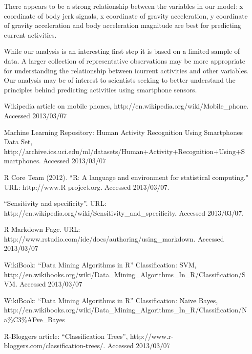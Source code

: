 \documentclass[a4paper,12pt]{extarticle}
\begin{document}
There appears to be a strong relationship between the variables in our model: x coordinate of body jerk signals, x coordinate of gravity acceleration, y coordinate of gravity acceleration and body acceleration magnitude are best for predicting current activities.

While our analysis is an interesting first step it is based on a limited sample of data. A larger collection of representative observations may be more appropriate for understanding the relationship between icurrent activities and other variables. Our analysis may be of interest to scientists seeking to better understand the principles behind predicting activities using smartphone sensors.

\newpage


\begin{thebibliography}{9}

  Wikipedia article on mobile phones, http://en.wikipedia.org/wiki/Mobile\_phone. Accessed 2013/03/07

  Machine Learning Repository: Human Activity Recognition Using Smartphones Data Set, http://archive.ics.uci.edu/ml/datasets/Human+Activity+Recognition+Using+Smartphones. Accessed 2013/03/07

  R Core Team (2012). ``R: A language and environment for statistical computing." URL: http://www.R-project.org. Accessed 2013/03/07.

  ``Sensitivity and specificity''. URL: http://en.wikipedia.org/wiki/Sensitivity\_and\_specificity. Accessed 2013/03/07.

  R Markdown Page. URL: http://www.rstudio.com/ide/docs/authoring/using\_markdown. Accessed 2013/03/07

  WikiBook: ``Data Mining Algorithms in R'' Classification: SVM, http://en.wikibooks.org/wiki/Data\_Mining\_Algorithms\_In\_R/Classification/SVM. Accessed 2013/03/07

  WikiBook: ``Data Mining Algorithms in R'' Classification: Naive Bayes,  http://en.wikibooks.org/wiki/Data\_Mining\_Algorithms\_In\_R/Classification/Na\%C3\%AFve\_Bayes

  R-Bloggers article: ``Classification Trees'', http://www.r-bloggers.com/classification-trees/. Accessed 2013/03/07

\end{thebibliography}
\end{document}
